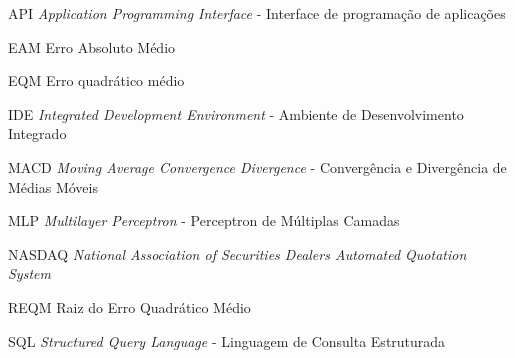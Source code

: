\begin{siglas}
	\item[API] \textit{Application Programming Interface} - Interface de programação de aplicações
	\item[EAM] Erro Absoluto Médio
	\item[EQM] Erro quadrático médio
	\item[IDE] \textit{Integrated Development Environment} - Ambiente de Desenvolvimento Integrado
	\item[MACD] \textit{Moving Average Convergence Divergence} - Convergência e Divergência de Médias Móveis
	\item[MLP] \textit{Multilayer Perceptron} - Perceptron de Múltiplas Camadas
	\item[NASDAQ] \textit{National Association of Securities Dealers Automated Quotation System}
	\item[REQM] Raiz do Erro Quadrático Médio
	\item[SQL] \textit{Structured Query Language} - Linguagem de Consulta Estruturada
\end{siglas}

